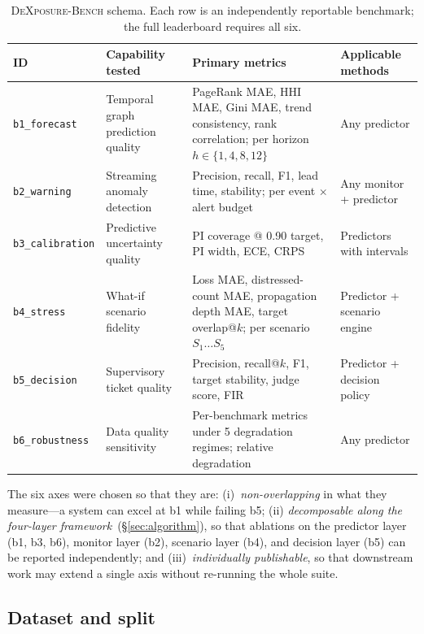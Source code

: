 \begin{table}[t]
\centering
\caption{\textsc{DeXposure-Bench} schema. Each row is an independently
reportable benchmark; the full leaderboard requires all six.}
\label{tab:bench-schema}
\footnotesize
\setlength{\tabcolsep}{4pt}
\begin{tabularx}{\linewidth}{@{}llXl@{}}
\toprule
ID & Capability tested & Primary metrics & Applicable methods \\
\midrule
\texttt{b1\_forecast}     & Temporal graph prediction quality
  & PageRank MAE, HHI MAE, Gini MAE, trend consistency, rank correlation; per horizon $h\in\{1,4,8,12\}$
  & Any predictor \\
\texttt{b2\_warning}      & Streaming anomaly detection
  & Precision, recall, F1, lead time, stability; per event $\times$ alert budget
  & Any monitor + predictor \\
\texttt{b3\_calibration}  & Predictive uncertainty quality
  & PI coverage @ 0.90 target, PI width, ECE, CRPS
  & Predictors with intervals \\
\texttt{b4\_stress}       & What-if scenario fidelity
  & Loss MAE, distressed-count MAE, propagation depth MAE, target overlap@$k$; per scenario $S_1\!\ldots\!S_5$
  & Predictor + scenario engine \\
\texttt{b5\_decision}     & Supervisory ticket quality
  & Precision, recall@$k$, F1, target stability, judge score, FIR
  & Predictor + decision policy \\
\texttt{b6\_robustness}   & Data quality sensitivity
  & Per-benchmark metrics under 5 degradation regimes; relative degradation
  & Any predictor \\
\bottomrule
\end{tabularx}
\end{table}

The six axes were chosen so that they are: (i)~\emph{non-overlapping}
in what they measure---a system can excel at b1 while failing b5; (ii)
\emph{decomposable along the four-layer
framework}~(\S\ref{sec:algorithm}), so that ablations on the
predictor layer (b1, b3, b6), monitor layer (b2), scenario layer (b4),
and decision layer (b5) can be reported independently; and
(iii)~\emph{individually publishable}, so that downstream work may
extend a single axis without re-running the whole suite.

\subsection{Dataset and split}

